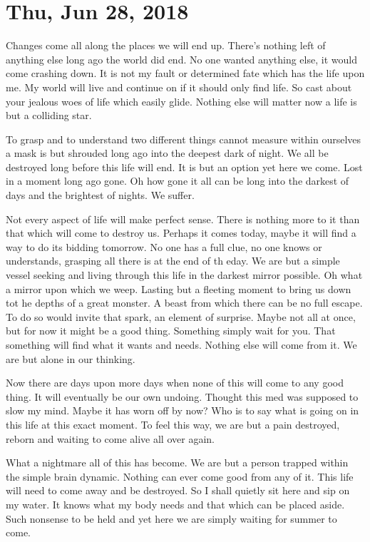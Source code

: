 \section{Thu, Jun 28, 2018}

Changes come all along the places we will end up. There's nothing left of
anything else long ago the world did end. No one wanted anything else, it would
come crashing down. It is not my fault or determined fate which has the life
upon me. My world will live and continue on if it should only find life. So cast
about your jealous woes of life which easily glide. Nothing else will matter now
a life is but a colliding star.

To grasp and to understand two different things cannot measure within ourselves
a mask is but shrouded long ago into the deepest dark of night. We all be
destroyed long before this life will end. It is but an option yet here we come.
Lost in a moment long ago gone. Oh how gone it all can be long into the darkest
of days and the brightest of nights. We suffer.

Not every aspect of life will make perfect sense. There is nothing more to it
than that which will come to destroy us. Perhaps it comes today, maybe it will
find a way to do its bidding tomorrow. No one has a full clue, no one knows or
understands, grasping all there is at the end of th eday. We are but a simple
vessel seeking and living through this life in the darkest mirror possible. Oh
what a mirror upon which we weep. Lasting but a fleeting moment to bring us down
tot he depths of a great monster. A beast from which there can be no full
escape. To do so would invite that spark, an element of surprise. Maybe not all
at once, but for now it might be a good thing. Something simply wait for you.
That something will find what it wants and needs. Nothing else will come from
it. We are but alone in our thinking.

Now there are days upon more days when none of this will come to any good thing.
It will eventually be our own undoing. Thought this med was supposed to slow my
mind. Maybe it has worn off by now? Who is to say what is going on in this life
at this exact moment. To feel this way, we are but a pain destroyed, reborn and
waiting to come alive all over again.

What a nightmare all of this has become. We are but a person trapped within the
simple brain dynamic. Nothing can ever come good from any of it. This life will
need to come away and be destroyed. So I shall quietly sit here and sip on my
water. It knows what my body needs and that which can be placed aside. Such
nonsense to be held and yet here we are simply waiting for summer to come.

